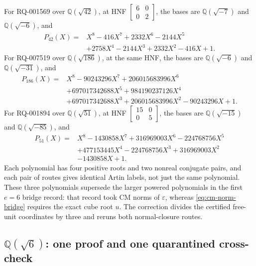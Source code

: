 \documentclass[11pt]{article}
\newcommand{\Q}{\mathbb Q}
\begin{document}
For RQ-001569 over \(\Q(\sqrt{42})\), at HNF
\(\left[\begin{smallmatrix}6&0\\0&2\end{smallmatrix}\right]\),
the bases are \(\Q(\sqrt{-7})\) and \(\Q(\sqrt{-6})\), and
\begin{equation}\label{eq:packet-q42}
\begin{aligned}
P_{42}(X)={}&X^8-416X^7+2332X^6-2144X^5\\
&+2758X^4-2144X^3+2332X^2-416X+1.
\end{aligned}
\end{equation}
For RQ-007519 over \(\Q(\sqrt{186})\), at the same HNF, the bases are
\(\Q(\sqrt{-6})\) and \(\Q(\sqrt{-31})\), and
\begin{equation}\label{eq:packet-q186}
\begin{aligned}
P_{186}(X)={}&X^8-90243296X^7+206015683996X^6\\
&+697017342688X^5+984190237126X^4\\
&+697017342688X^3+206015683996X^2-90243296X+1.
\end{aligned}
\end{equation}
For RQ-001894 over \(\Q(\sqrt{51})\), at HNF
\(\left[\begin{smallmatrix}15&0\\0&5\end{smallmatrix}\right]\),
the bases are \(\Q(\sqrt{-15})\) and \(\Q(\sqrt{-85})\), and
\begin{equation}\label{eq:packet-q51}
\begin{aligned}
P_{51}(X)={}&X^8-1430858X^7+316969003X^6-224768756X^5\\
&+477153445X^4-224768756X^3+316969003X^2\\
&-1430858X+1.
\end{aligned}
\end{equation}
Each polynomial has four positive roots and two nonreal conjugate
pairs, and each pair of routes gives identical Artin labels, not just
the same polynomial.  These three polynomials supersede the larger
powered polynomials in the first \(e=6\) bridge record: that record
took CM norms of \(\varepsilon\), whereas
\eqref{eq:cm-norm-bridge} requires the exact
cube root \(u\).  The correction divides the certified free-unit
coordinates by three and reruns both normal-closure routes.

\subsection{\texorpdfstring{\(\Q(\sqrt6)\)}{Q(sqrt(6))}: one proof
and one quarantined cross-check}
\end{document}
